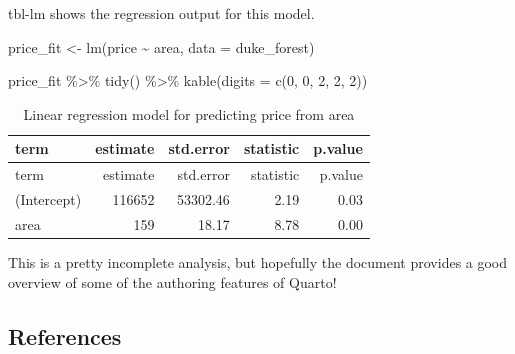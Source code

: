 \documentclass[
  letterpaper,
  DIV=11,
  numbers=noendperiod,
  oneside]{scrartcl}
\newenvironment{Shaded}{}{}
\newcommand{\AttributeTok}[1]{\textcolor[rgb]{0.49,0.56,0.16}{#1}}
\newcommand{\DecValTok}[1]{\textcolor[rgb]{0.25,0.63,0.44}{#1}}
\newcommand{\FunctionTok}[1]{\textcolor[rgb]{0.02,0.16,0.49}{#1}}
\newcommand{\NormalTok}[1]{#1}
\newcommand{\OtherTok}[1]{\textcolor[rgb]{0.00,0.44,0.13}{#1}}
\newcommand{\SpecialCharTok}[1]{\textcolor[rgb]{0.25,0.44,0.63}{#1}}
\begin{document}
tbl-lm shows the regression output for this model.

\begin{Shaded}
\begin{Highlighting}[]
\NormalTok{price\_fit }\OtherTok{\textless{}{-}} \FunctionTok{lm}\NormalTok{(price }\SpecialCharTok{\textasciitilde{}}\NormalTok{ area, }\AttributeTok{data =}\NormalTok{ duke\_forest)}
  
\NormalTok{price\_fit }\SpecialCharTok{\%\textgreater{}\%}
  \FunctionTok{tidy}\NormalTok{() }\SpecialCharTok{\%\textgreater{}\%}
  \FunctionTok{kable}\NormalTok{(}\AttributeTok{digits =} \FunctionTok{c}\NormalTok{(}\DecValTok{0}\NormalTok{, }\DecValTok{0}\NormalTok{, }\DecValTok{2}\NormalTok{, }\DecValTok{2}\NormalTok{, }\DecValTok{2}\NormalTok{))}
\end{Highlighting}
\end{Shaded}

\hypertarget{tbl-lm}{}
\begin{longtable}[]{@{}lrrrr@{}}
\caption{\label{tbl-lm}Linear regression model for predicting price from
area}\tabularnewline
\toprule()
term & estimate & std.error & statistic & p.value \\
\midrule()
\endfirsthead
\toprule()
term & estimate & std.error & statistic & p.value \\
\midrule()
\endhead
(Intercept) & 116652 & 53302.46 & 2.19 & 0.03 \\
area & 159 & 18.17 & 8.78 & 0.00 \\
\bottomrule()
\end{longtable}

\begin{tcolorbox}[enhanced jigsaw, colframe=quarto-callout-note-color-frame, title=\textcolor{quarto-callout-note-color}{\faInfo}\hspace{0.5em}{Note}, opacityback=0, bottomtitle=1mm, titlerule=0mm, toptitle=1mm, breakable, rightrule=.15mm, colback=white, colbacktitle=quarto-callout-note-color!10!white, toprule=.15mm, arc=.35mm, coltitle=black, left=2mm, opacitybacktitle=0.6, bottomrule=.15mm, leftrule=.75mm]
This is a pretty incomplete analysis, but hopefully the document
provides a good overview of some of the authoring features of Quarto!
\end{tcolorbox}

\hypertarget{references}{%
\subsection*{References}\label{references}}
\end{document}
